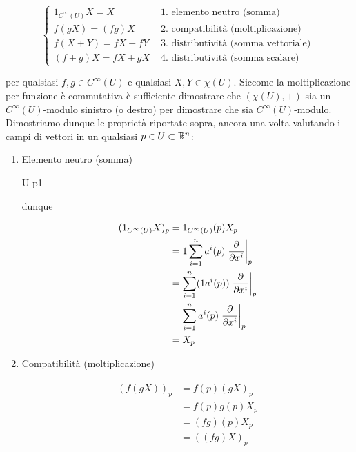 {\begin{equation}
	\begin{cases}
		1_{C^{\infty}(U)} X = X & \text{ 1. elemento neutro (somma) } \\
		f (g X) = (f g) X & \text{ 2. compatibilità (moltiplicazione) } \\
		f (X+Y) = f X + f Y & \text{ 3. distributività (somma vettoriale) } \\
		(f+g) X = f X + g X & \text{ 4. distributività (somma scalare) }
	\end{cases}
\end{equation}

per qualsiasi $ f,g \in C^{\infty}(U) $ e qualsiasi $ X,Y \in \chi(U) $. Siccome la moltiplicazione per funzione è commutativa è sufficiente dimostrare che $ (\chi(U),+) $ sia un $ C^{\infty}(U) $-modulo sinistro (o destro) per dimostrare che sia $ C^{\infty}(U) $-modulo. \\
Dimostriamo dunque le proprietà riportate sopra, ancora una volta valutando i campi di vettori in un qualsiasi $ p \in U \subset \mathbb{R}^{n} $:

\begin{enumerate}
	\item Elemento neutro (somma)
	
		{U}{\R}
		{p}{1}
	
	dunque
	
	\begin{align}
		\begin{split}
			(1_{C^{\infty}(U)} X)_{p} &= 1_{C^{\infty}(U)} (p) X_{p} \\
			&= 1 \sum_{i=1}^{n} a^{i} (p) \eval{ \pdv{x^{i}} }_{p} \\
			&= \sum_{i=1}^{n} (1 a^{i} (p)) \eval{ \pdv{x^{i}} }_{p} \\
			&= \sum_{i=1}^{n} a^{i} (p) \eval{ \pdv{x^{i}} }_{p} \\
			&= X_{p}
		\end{split}
	\end{align}
	
	\item Compatibilità (moltiplicazione)
	
	\begin{align}
		\begin{split}
			(f (g X))_{p} &= f (p) (g X)_{p} \\
			&= f (p) g (p) X_{p} \\
			&= (f g) (p) X_{p} \\
			&= ((f g) X)_{p}
		\end{split}
	\end{align}
	

\end{enumerate}}
